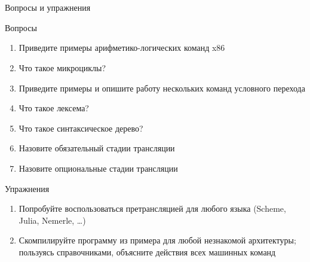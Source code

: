 \documentclass[xetex,aspectratio=43]{beamer}
\begin{document}

\section*{}

\begin{frame}{Вопросы и упражнения}
    \begin{block}{Вопросы}
        \protect\hypertarget{ux432ux43eux43fux440ux43eux441ux44b}{}
        \begin{enumerate}
            \tightlist
            \item
            Приведите примеры арифметико-логических команд x86
            \item
            Что такое микроциклы?
            \item
            Приведите примеры и опишите работу нескольких команд условного
            перехода
            \item
            Что такое лексема?
            \item
            Что такое синтаксическое дерево?
            \item
            Назовите обязательный стадии трансляции
            \item
            Назовите опциональные стадии трансляции
        \end{enumerate}
    \end{block}

    \begin{block}{Упражнения}
        \protect\hypertarget{ux443ux43fux440ux430ux436ux43dux435ux43dux438ux44f}{}
        \begin{enumerate}
            \tightlist
            \item
            Попробуйте воспользоваться претрансляцией для любого языка (Scheme,
            Julia, Nemerle, \ldots)
            \item
            Скомпилируйте программу из примера для любой незнакомой архитектуры;
            пользуясь справочниками, объясните действия всех машинных команд
        \end{enumerate}
    \end{block}
\end{frame}

\postamble
\end{document}
